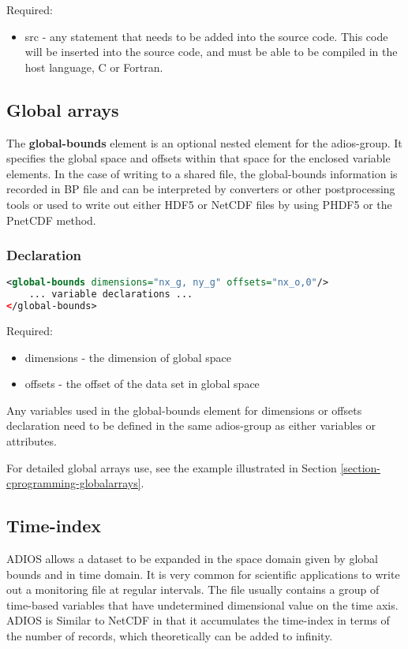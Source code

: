 Required:
\begin{itemize}
\item src -  any statement that needs to be added into the source code. This code will 
be inserted into the source code, and must be able to be compiled in the host language, 
C or Fortran. 
\end{itemize}

\subsection{Global arrays}
\label{section-xml-global-arrays}
The \textbf{global-bounds} element is an optional nested element for the adios-group. 
It specifies the global space and offsets within that space for the enclosed variable 
elements. In the case of writing to a shared file, the global-bounds information 
is recorded in BP file and can be interpreted by converters or other postprocessing 
tools or used to write out either HDF5 or NetCDF files by using PHDF5 or the PnetCDF 
method.

\subsubsection{Declaration}
\begin{lstlisting}[language=XML]
<global-bounds dimensions="nx_g, ny_g" offsets="nx_o,0"/>
    ... variable declarations ... 
</global-bounds>
\end{lstlisting}

Required:
\begin{itemize}
\item dimensions - the dimension of global space
\item offsets - the offset of the data set in global space
\end{itemize}

Any variables used in the global-bounds element for dimensions or offsets declaration 
need to be defined in the same adios-group as either variables or attributes. 

For detailed global arrays use, see the example illustrated in 
Section \ref{section-cprogramming-globalarrays}.


\subsection{Time-index}

ADIOS allows a dataset to be expanded in the space domain given by global bounds 
and in time domain. It is very common for scientific applications to write out 
a monitoring file at regular intervals. The file usually contains a group of time-based 
variables that have undetermined dimensional value on the time axis. ADIOS is Similar 
to NetCDF in that it accumulates the time-index in terms of the number of records, 
which theoretically can be added to infinity.

